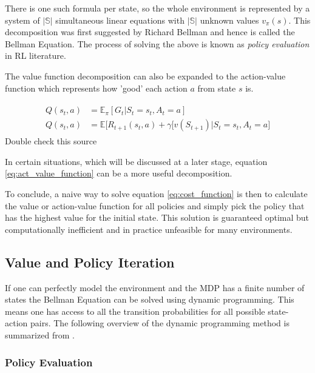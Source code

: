 There is one such formula per state, so the whole environment is represented by a system of $|\mathbb{S}|$ simultaneous linear equations with $|\mathbb{S}|$ unknown values $v_\pi(s)$. This decomposition was first suggested by Richard Bellman\citep{bellman_1957} and hence is called the Bellman Equation. The process of solving the above is known as \textit{policy evaluation} in RL literature.

The value function decomposition can also be expanded to the action-value function which represents how 'good' each action $a$ from state $s$ is.

\begin{align}
\begin{split}
    \label{eq:act_value_function} 
    Q(s_t, a) &=  \mathbb{E}_\pi[G_t|S_t=s_t, A_t=a] \\
    Q(s_t, a) &= \mathbb{E}\big[R_{t+1}(s_t, a) + \gamma[v(S_{t+1})|S_t=s_t, A_t = a\big]
\end{split}
\end{align}
\todo Double check this source

In certain situations, which will be discussed at a later stage, equation \ref{eq:act_value_function} can be a more useful decomposition.

To conclude, a naive way to solve equation \ref{eq:cost_function} is then to calculate the value or action-value function for all policies and simply pick the policy that has the highest value for the initial state. This solution is guaranteed optimal but computationally inefficient and in practice unfeasible for many environments.

\citep[p.~58-61]{powell_2011}\citep[p.~59]{sutton_barto_2018}

\subsection{Value and Policy Iteration}

If one can perfectly model the environment and the MDP has a finite number of states the Bellman Equation can be solved using dynamic programming. This means one has access to all the transition probabilities for all possible state-action pairs. The following overview of the dynamic programming method is summarized from \cite[p.~74-84]{sutton_barto_2018}.

\subsubsection{Policy Evaluation}

